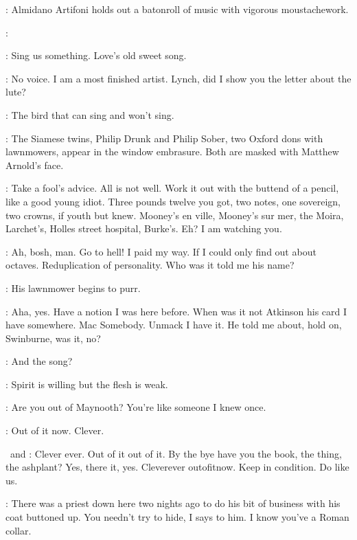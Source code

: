 :
Almidano Artifoni holds out a batonroll of music with vigorous moustachework.

\Artifoni:

\Florry[1]:
Sing us something.
Love's old sweet song.

\Stephen:
No voice.
I am a most finished artist.
Lynch, did I show you the letter about the lute?

\Florry:
The bird that can sing and won't sing.

:
The Siamese twins, Philip Drunk and Philip Sober,
two Oxford dons with lawnmowers, appear in the window embrasure.
Both are masked with Matthew Arnold's face.

\PhilipSober[2]:
Take a fool's advice.
All is not well.
Work it out with the buttend of a pencil, like a good young idiot.
Three pounds twelve you got, two notes,
one sovereign, two crowns, if youth but knew.
Mooney's en ville, Mooney's sur mer, the Moira, Larchet's,
Holles street hospital, Burke's.
Eh? I am watching you.%

\PhilipDrunk[2]:
Ah, bosh, man.
Go to hell!
I paid my way.
If I could only find out about octaves.
Reduplication of personality.
Who was it told me his name?

:
His lawnmower begins to purr.

\PhilipDrunk:
Aha, yes.
Have a notion I was here before.
When was it not Atkinson his card I have somewhere.
Mac Somebody.
Unmack I have it.
He told me about, hold on, Swinburne, was it, no?

\Florry:
And the song?

\Stephen:
Spirit is willing but the flesh is weak.

\Florry:
Are you out of Maynooth?
You're like someone I knew once.

\Stephen:
Out of it now.
Clever.


\PhilipDrunk\ and \PhilipSober:
Clever ever.
Out of it out of it.
By the bye have you the book, the thing, the ashplant?
Yes, there it, yes.
Cleverever outofitnow.
Keep in condition.
Do like us.

\Zoe:
There was a priest down here two nights ago
to do his bit of business with his coat buttoned up.
You needn't try to hide, I says to him.
I know you've a Roman collar.

